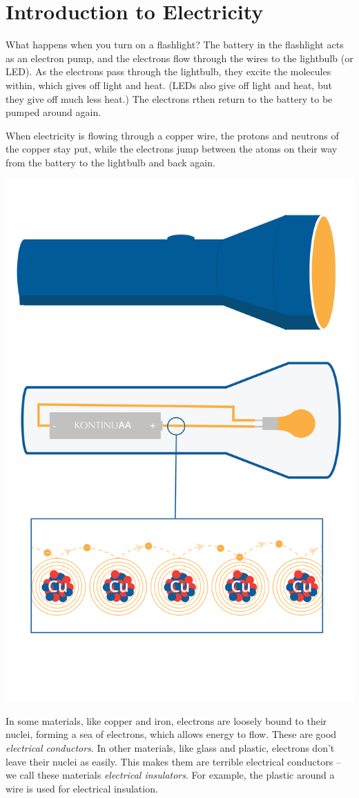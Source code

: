 \chapter{Introduction to Electricity}

What happens when you turn on a flashlight? The battery in the
flashlight acts as an electron pump, and the electrons flow through the
wires to the lightbulb (or LED). As the electrons pass through the
lightbulb, they excite the molecules within, which gives off light and
heat. (LEDs also give off light and heat, but they give off much less
heat.) The electrons rthen return to the battery to be pumped around
again.

When electricity is flowing through a copper wire, the protons and
neutrons of the copper stay put, while the electrons jump between the
atoms on their way from the battery to the lightbulb and back again.

\includegraphics[width=.5\textwidth]{flashlight.png}


In some materials, like copper and iron, electrons are loosely bound
to their nuclei, forming a sea of electrons, which allows energy to flow. These are good \textit{electrical conductors}. In
other materials, like glass and plastic, electrons don't leave their
nuclei as easily. This makes them are terrible electrical conductors -- we call
these materials \textit{electrical insulators}. For example, the plastic around a
wire is used for electrical insulation.

